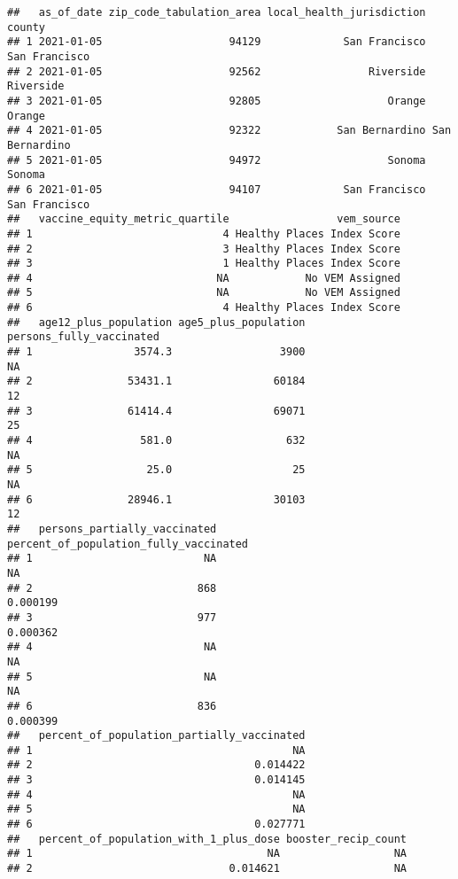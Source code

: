 \documentclass[
]{article}
\begin{document}
\begin{verbatim}
##   as_of_date zip_code_tabulation_area local_health_jurisdiction         county
## 1 2021-01-05                    94129             San Francisco  San Francisco
## 2 2021-01-05                    92562                 Riverside      Riverside
## 3 2021-01-05                    92805                    Orange         Orange
## 4 2021-01-05                    92322            San Bernardino San Bernardino
## 5 2021-01-05                    94972                    Sonoma         Sonoma
## 6 2021-01-05                    94107             San Francisco  San Francisco
##   vaccine_equity_metric_quartile                 vem_source
## 1                              4 Healthy Places Index Score
## 2                              3 Healthy Places Index Score
## 3                              1 Healthy Places Index Score
## 4                             NA            No VEM Assigned
## 5                             NA            No VEM Assigned
## 6                              4 Healthy Places Index Score
##   age12_plus_population age5_plus_population persons_fully_vaccinated
## 1                3574.3                 3900                       NA
## 2               53431.1                60184                       12
## 3               61414.4                69071                       25
## 4                 581.0                  632                       NA
## 5                  25.0                   25                       NA
## 6               28946.1                30103                       12
##   persons_partially_vaccinated percent_of_population_fully_vaccinated
## 1                           NA                                     NA
## 2                          868                               0.000199
## 3                          977                               0.000362
## 4                           NA                                     NA
## 5                           NA                                     NA
## 6                          836                               0.000399
##   percent_of_population_partially_vaccinated
## 1                                         NA
## 2                                   0.014422
## 3                                   0.014145
## 4                                         NA
## 5                                         NA
## 6                                   0.027771
##   percent_of_population_with_1_plus_dose booster_recip_count
## 1                                     NA                  NA
## 2                               0.014621                  NA

\end{verbatim}
\end{document}
